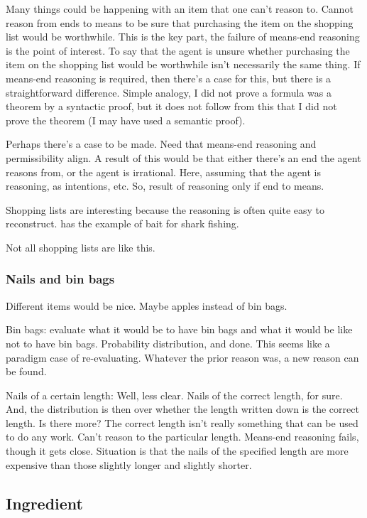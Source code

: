 \documentclass[10pt]{article}
\begin{document}
Many things could be happening with an item that one can't reason to.
Cannot reason from ends to means to be sure that purchasing the item on the shopping list would be worthwhile.
This is the key part, the failure of means-end reasoning is the point of interest.
To say that the agent is unsure whether purchasing the item on the shopping list would be worthwhile isn't necessarily the same thing.
If means-end reasoning is required, then there's a case for this, but there is a straightforward difference.
Simple analogy, I did not prove a formula was a theorem by a syntactic proof, but it does not follow from this that I did not prove the theorem (I may have used a semantic proof).

Perhaps there's a case to be made.
Need that means-end reasoning and permissibility align.
A result of this would be that either there's an end the agent reasons from, or the agent is irrational.
Here, assuming that the agent is reasoning, as intentions, etc.
So, result of reasoning only if end to means.

Shopping lists are interesting because the reasoning is often quite easy to reconstruct.
\citeauthor{Anscombe:1957aa} has the example of bait for shark fishing.

Not all shopping lists are like this.


\subsubsection{Nails and bin bags}
\label{sec:nails-bin-bags}

{\color{red}
  Different items would be nice.
  Maybe apples instead of bin bags.
}

Bin bags: evaluate what it would be to have bin bags and what it would be like not to have bin bags.
Probability distribution, and done.
This seems like a paradigm case of re-evaluating.
Whatever the prior reason was, a new reason can be found.

Nails of a certain length:
Well, less clear.
Nails of the correct length, for sure.
And, the distribution is then over whether the length written down is the correct length.
Is there more?
The correct length isn't really something that can be used to do any work.
Can't reason to the particular length.
Means-end reasoning fails, though it gets close.
Situation is that the nails of the specified length are more expensive than those slightly longer and slightly shorter.


\subsection{Ingredient}
\label{sec:ingredient}
\end{document}
